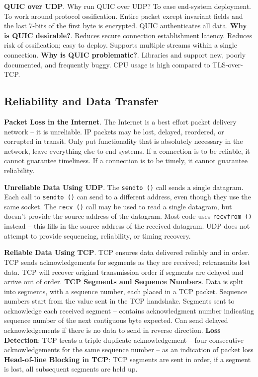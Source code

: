 \documentclass{article}
\begin{document}
\textbf{QUIC over UDP}. Why run QUIC over UDP? To ease end-system deployment.
To work around protocol ossification.
Entire packet except invariant fields and the last 7-bits of the first byte is encrypted.
QUIC authenticates all data.
\textbf{Why is QUIC desirable?}.
Reduces secure connection establishment latency.
Reduces risk of ossification; easy to deploy.
Supports multiple streams within a single connection.
\textbf{Why is QUIC problematic?}.
Libraries and support new, poorly documented, and frequently buggy.
CPU usage is high compared to TLS-over-TCP.


\subsection*{Reliability and Data Transfer}

\textbf{Packet Loss in the Internet}.
The Internet is a best effort packet delivery network – it is unreliable.
IP packets may be lost, delayed, reordered, or corrupted in transit.
Only put functionality that is absolutely necessary in the network, leave everything else to end systems.
If a connection is to be reliable, it cannot guarantee timeliness.
If a connection is to be timely, it cannot guarantee reliability.

\textbf{Unreliable Data Using UDP}.
The \texttt{sendto ()} call sends a single datagram.
Each call to \texttt{sendto ()} can send to a different address, even though they use the same socket.
The \texttt{recv ()} call may be used to read a single datagram, but doesn’t provide the source address of the datagram.
Most code uses \texttt{recvfrom ()} instead – this fills in the source address of the received datagram.
UDP does not attempt to provide sequencing, reliability, or timing recovery.

\textbf{Reliable Data Using TCP}.
TCP ensures data delivered reliably and in order.
TCP sends acknowledgements for segments as they are received; retransmits lost data.
TCP will recover original transmission order if segments are delayed and arrive out of order.
\textbf{TCP Segments and Sequence Numbers}. Data is split into segments, with a sequence number, each placed in a TCP packet.
Sequence numbers start from the value sent in the TCP handshake.
Segments sent to acknowledge each received segment – contains acknowledgment number indicating sequence number of the next
contiguous byte expected.
Can send delayed acknowledgements if there is no data to send in reverse direction.
\textbf{Loss Detection}: TCP treats a triple duplicate acknowledgement – four consecutive acknowledgements for the same sequence
number – as an indication of packet loss
\textbf{Head-of-line Blocking in TCP}: TCP segments are sent in order, if a segment is lost, all subsequent segments are held up.
\end{document}
